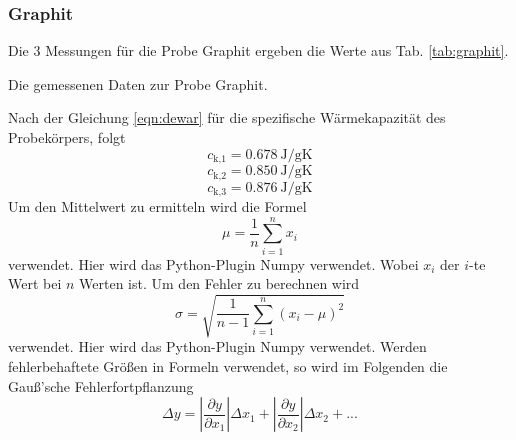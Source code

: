 \subsubsection{Graphit}
Die 3 Messungen für die Probe Graphit ergeben die Werte aus Tab. \ref{tab:graphit}.
\begin{table}
    \centering
    \caption{Die gemessenen Daten zur Probe Graphit. }
    \label{tab:graphit}  
\end{table}
Nach der Gleichung \eqref{eqn:dewar} für die spezifische Wärmekapazität des Probekörpers, folgt
\begin{equation}
    c_\text{k,1} = \SI{0.678}{\joule/\gram\kelvin}
\end{equation}
\begin{equation}
    c_\text{k,2} = \SI{0.850}{\joule/\gram\kelvin}
\end{equation}
\begin{equation}
    c_\text{k,3} = \SI{0.876}{\joule/\gram\kelvin}
\end{equation}
Um den Mittelwert zu ermitteln wird die Formel
\begin{equation}
    \mu = \frac{1}{n} \sum_{i=1}^n x_i
    \label{eqn:mittel}
\end{equation}
verwendet. Hier wird das Python-Plugin Numpy \cite{numpy} verwendet.
Wobei $x_i$ der $i$-te Wert bei $n$ Werten ist.
Um den Fehler zu berechnen wird
\begin{equation}
    \sigma = \sqrt{\frac{1}{n-1} \sum_{i=1}^n (x_i - \mu)^2}
    \label{eqn:fehler}
\end{equation}
verwendet. Hier wird das Python-Plugin Numpy \cite{numpy} verwendet.
Werden fehlerbehaftete Größen in Formeln verwendet, so wird im Folgenden die Gauß'sche Fehlerfortpflanzung 
\begin{equation}
    \Delta y = \left|\frac{\partial y}{\partial x_1}\right| \Delta x_1 + \left|\frac{\partial y}{\partial x_2}\right| \Delta x_2 + ...
\end{equation}
